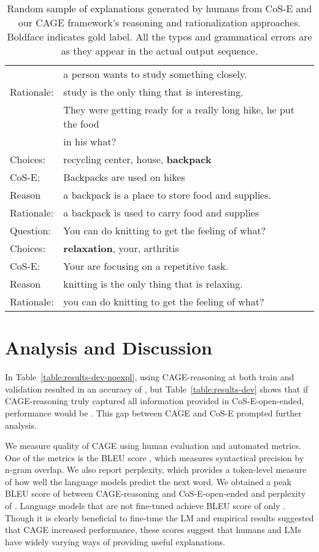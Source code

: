 \documentclass[11pt,a4paper]{article}
\begin{document}
\begin{table}[!t]
\begin{tabular}{ll}
\begin{comment}
Reason &a person wants to study something closely.\\
Rationale: &study is the only thing that is interesting.\\
\hline
\end{comment}
Question: &They were getting ready for a really long hike, he put the food \\
&in his what?\\ 
Choices: &recycling center, house, \textbf{backpack}\\
CoS-E: & Backpacks are used on hikes\\
Reason &a backpack is a place to store food and supplies.\\
Rationale: & a backpack is used to carry food and supplies\\
\midrule
Question: &You can do knitting to get the feeling of what?\\ 
Choices: &\textbf{relaxation}, your, arthritis \\
CoS-E: & Your are focusing on a repetitive task.\\
Reason &knitting is the only thing that is relaxing.\\
Rationale: &you can do knitting to get the feeling of what?\\
\bottomrule
\end{tabular}
\caption{Random sample of explanations generated by humans from CoS-E and our CAGE framework's reasoning and rationalization approaches. Boldface indicates gold label. All the typos and grammatical errors are as they appear in the actual output sequence.}
\vspace{-0.5cm}
\label{table:head_to_head}
\end{table} \section{Analysis and Discussion}
\vspace{-0.2cm}
In Table~\ref{table:results-dev-noexpl}, using CAGE-reasoning at both train and validation resulted in an accuracy of , 
but Table~\ref{table:results-dev} shows that if CAGE-reasoning truly captured all information provided in CoS-E-open-ended, performance would be . 
This gap between CAGE and CoS-E prompted further analysis.

We measure quality of CAGE using human evaluation and automated metrics. 
One of the metrics is the BLEU score \citep{papineni2002bleu}, 
which measures syntactical precision by n-gram overlap. 
We also report perplexity, which provides a token-level measure of how well the language models predict the next word.
We obtained a peak BLEU score of  between CAGE-reasoning and CoS-E-open-ended and perplexity of  .
Language models that are not fine-tuned achieve BLEU score of only .
Though it is clearly beneficial to fine-tune the LM and empirical results suggested that CAGE increased performance,
these scores suggest that humans and LMs have widely varying ways of providing useful explanations.
\end{document}
